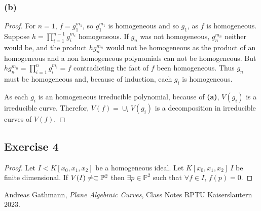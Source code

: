 \documentclass[11pt,a4paper]{article}
\begin{document}
\subsubsection*{(b)}
  \begin{proof}
    For $ n = 1 $, $ f = g_1^{m_1} $, so $ g_1^{m_1} $ is homogeneous and so $ g_1 $, as $ f $ is homogeneous. Suppose $ h = \prod_{i=1}^{n-1} g_i^{m_i} $ homogeneous. If $ g_n $ was not homogeneous, $ g_n^{m_n} $ neither would be, and the product $ h g_n^{m_n} $ would not be homogeneous as the product of an homogeneous and a non homogeneous polynomials can not be homogeneous. But $ h g_n^{m_n} = \prod_{i=1}^n g_i^{m_i} = f $ contradicting the fact of $ f $ been homogeneous. Thus $ g_n $ must be homogeneous and, because of induction, each $ g_i $ is homogeneous.

    \vspace{1mm}
    As each $ g_i $ is an homogeneous irreducible polynomial, because of {\bf (a)}, $ V(g_i) $ is a irreducible curve. Therefor, $ V(f) = \cup_i V(g_i) $ is a decomposition in irreducible curves of $ V(f) $.
  \end{proof}

\subsection*{Exercise 4}
\begin{proof}
  Let $ I < K[x_0, x_1, x_2] $ be a homogeneous ideal. Let $ K[x_0, x_1, x_2] \ I $ be finite dimensional. If $ V(I) \neq \empty \subset \mathbb P^2 $ then $ \exists p \in \mathbb P^2 $ such that $ \forall f \in I $, $ f(p) = 0 $.
\end{proof}


\begin{thebibliography}{9}

  Andreas Gathmann,
  \textit{Plane Algebraic Curves},
  Class Notes RPTU Kaiserslautern 2023.
  
\end{thebibliography}
\end{document}
